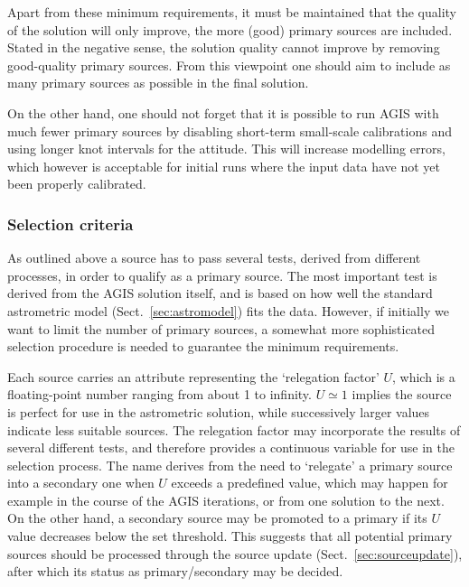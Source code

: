 \documentclass[structabstract]{aa}
\begin{document}
Apart from these minimum requirements, it must be maintained that 
the quality of the solution will only improve, the more (good) primary 
sources are included. Stated in the negative sense, the solution quality 
cannot improve by removing good-quality primary sources. From this
viewpoint one should aim to include as many primary sources as 
possible in the final solution.

On the other hand, one should not forget that it is possible to run AGIS 
with much fewer primary sources by disabling short-term small-scale 
calibrations and using longer knot intervals for the attitude. This will 
increase modelling errors, which however is acceptable for initial runs 
where the input data have not yet been properly calibrated.


\subsubsection{Selection criteria} \label{sec:relegate}

As outlined above a source has to pass several tests, derived from 
different processes, in order to qualify as a primary source. The most
important test is derived from the AGIS solution itself, and is based 
on how well the standard astrometric model (Sect.~\ref{sec:astromodel}) 
fits the data. However, if initially we want to limit the number of primary
sources, a somewhat more sophisticated selection procedure is needed
to guarantee the minimum requirements.

Each source carries an attribute representing the `relegation factor' $U$,
which is a floating-point number ranging from about 1 to infinity.
$U\simeq 1$ implies the source is perfect for use in the astrometric 
solution, while successively larger values indicate less suitable sources.
The relegation factor may incorporate the results of several different 
tests, and therefore provides a continuous variable for use in the selection 
process. The name derives from the need to `relegate' a primary source
into a secondary one when $U$ exceeds a predefined value, which may
happen for example in the course of the AGIS iterations, or from one
solution to the next. On the other hand, a secondary source may be
promoted to a primary if its $U$ value decreases below the set threshold.
This suggests that all potential primary sources should be processed
through the source update (Sect.~\ref{sec:sourceupdate}), after which its 
status as primary/secondary may be decided.
\end{document}
